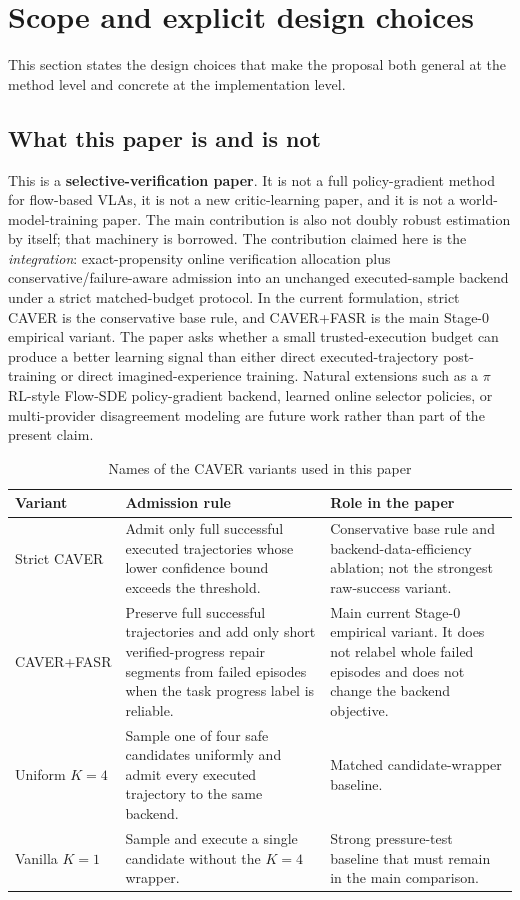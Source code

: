 \documentclass[10pt]{article}
\theoremstyle{plain}
\theoremstyle{definition}
\theoremstyle{remark}
\begin{document}
\section{Scope and explicit design choices}
This section states the design choices that make the proposal both general at the method level and concrete at the implementation level.

\subsection{What this paper is and is not}
This is a \textbf{selective-verification paper}. It is not a full policy-gradient method for flow-based VLAs, it is not a new critic-learning paper, and it is not a world-model-training paper. The main contribution is also not doubly robust estimation by itself; that machinery is borrowed. The contribution claimed here is the \emph{integration}: exact-propensity online verification allocation plus conservative/failure-aware admission into an unchanged executed-sample backend under a strict matched-budget protocol. In the current formulation, strict CAVER is the conservative base rule, and CAVER+FASR is the main Stage-0 empirical variant. The paper asks whether a small trusted-execution budget can produce a better learning signal than either direct executed-trajectory post-training or direct imagined-experience training. Natural extensions such as a $\pi$RL-style Flow-SDE policy-gradient backend, learned online selector policies, or multi-provider disagreement modeling are future work rather than part of the present claim.

\begin{table}[H]
\centering
\small
\caption*{Names of the CAVER variants used in this paper}
\begin{tabularx}{\linewidth}{@{}p{3.2cm}p{4.2cm}X@{}}
\toprule
Variant & Admission rule & Role in the paper \\
\midrule
Strict CAVER & Admit only full successful executed trajectories whose lower confidence bound exceeds the threshold. & Conservative base rule and backend-data-efficiency ablation; not the strongest raw-success variant. \\
CAVER+FASR & Preserve full successful trajectories and add only short verified-progress repair segments from failed episodes when the task progress label is reliable. & Main current Stage-0 empirical variant. It does not relabel whole failed episodes and does not change the backend objective. \\
Uniform $K=4$ & Sample one of four safe candidates uniformly and admit every executed trajectory to the same backend. & Matched candidate-wrapper baseline. \\
Vanilla $K=1$ & Sample and execute a single candidate without the $K=4$ wrapper. & Strong pressure-test baseline that must remain in the main comparison. \\
\bottomrule
\end{tabularx}
\end{table}
\end{document}

